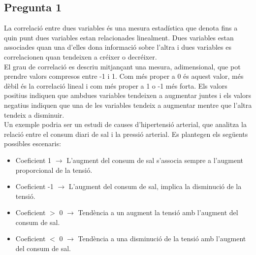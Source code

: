 \documentclass[a4paper,12pt]{report}
\begin{document}
\subsection*{Pregunta 1}
La correlació entre dues variables és una mesura estadística que denota fins a quin punt dues variables estan relacionades linealment. Dues variables estan associades quan una d'elles dona informació sobre l'altra i dues variables es correlacionen quan tendeixen a créixer o decréixer.\\
El grau de correlació es descriu mitjançant una mesura, adimensional, que pot prendre valors compresos entre -1 i 1. Com més proper a 0 és aquest valor, més dèbil és la correlació lineal i com més proper a 1 o -1 més forta. Els valors positius indiquen que ambdues variables tendeixen a augmentar juntes i els valors negatius indiquen que una de les variables tendeix a augmentar mentre que l'altra tendeix a disminuir.\\
Un exemple podria ser un estudi de causes d'hipertensió arterial, que analitza la relació entre el consum diari de sal i la pressió arterial. Es plantegen els següents possibles escenaris:
\begin{itemize}
    \item Coeficient 1 $\longrightarrow$ L'augment del consum de sal s'associa sempre a l'augment proporcional de la tensió.
    \item Coeficient -1 $\longrightarrow$ L'augment del consum de sal, implica la disminució de la tensió.
    \item Coeficient $>$ 0 $\longrightarrow$ Tendència a un augment la tensió amb l'augment del consum de sal.
    \item Coeficient $<$ 0 $\longrightarrow$ Tendència a una disminució de la tensió amb l'augment del consum de sal.
\end{itemize}
\end{document}
